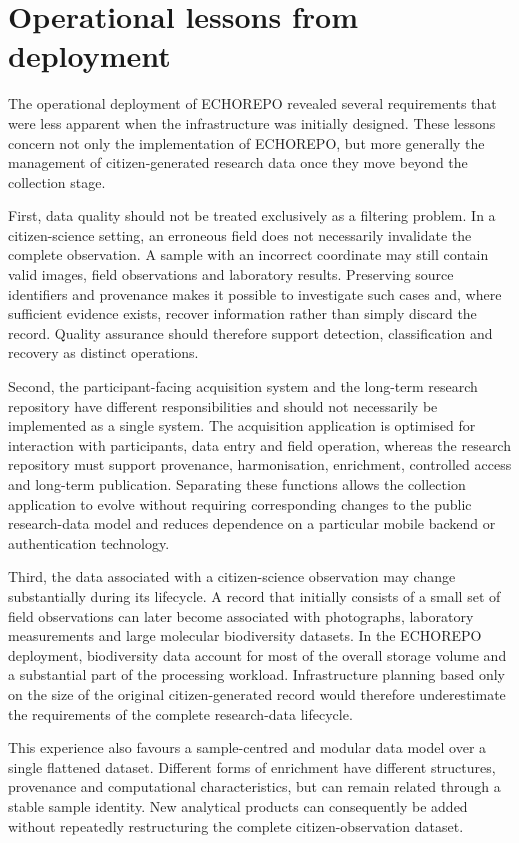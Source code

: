 \section{Operational lessons from deployment}

The operational deployment of ECHOREPO revealed several requirements that were less apparent when the infrastructure was initially designed. These lessons concern not only the implementation of ECHOREPO, but more generally the management of citizen-generated research data once they move beyond the collection stage.

First, data quality should not be treated exclusively as a filtering problem. In a citizen-science setting, an erroneous field does not necessarily invalidate the complete observation. A sample with an incorrect coordinate may still contain valid images, field observations and laboratory results. Preserving source identifiers and provenance makes it possible to investigate such cases and, where sufficient evidence exists, recover information rather than simply discard the record. Quality assurance should therefore support detection, classification and recovery as distinct operations.

Second, the participant-facing acquisition system and the long-term research repository have different responsibilities and should not necessarily be implemented as a single system. The acquisition application is optimised for interaction with participants, data entry and field operation, whereas the research repository must support provenance, harmonisation, enrichment, controlled access and long-term publication. Separating these functions allows the collection application to evolve without requiring corresponding changes to the public research-data model and reduces dependence on a particular mobile backend or authentication technology.

Third, the data associated with a citizen-science observation may change substantially during its lifecycle. A record that initially consists of a small set of field observations can later become associated with photographs, laboratory measurements and large molecular biodiversity datasets. In the ECHOREPO deployment, biodiversity data account for most of the overall storage volume and a substantial part of the processing workload. Infrastructure planning based only on the size of the original citizen-generated record would therefore underestimate the requirements of the complete research-data lifecycle.

This experience also favours a sample-centred and modular data model over a single flattened dataset. Different forms of enrichment have different structures, provenance and computational characteristics, but can remain related through a stable sample identity. New analytical products can consequently be added without repeatedly restructuring the complete citizen-observation dataset.

